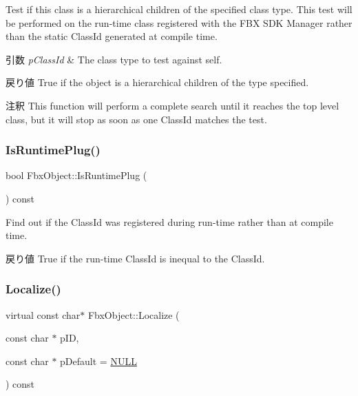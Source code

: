 Test if this class is a hierarchical children of the specified class type. This test will be performed on the run-\/time class registered with the F\+BX S\+DK Manager rather than the static Class\+Id generated at compile time. 
\begin{DoxyParams}{引数}
{\em p\+Class\+Id} & The class type to test against self. \\
\hline
\end{DoxyParams}
\begin{DoxyReturn}{戻り値}
True if the object is a hierarchical children of the type specified. 
\end{DoxyReturn}
\begin{DoxyRemark}{注釈}
This function will perform a complete search until it reaches the top level class, but it will stop as soon as one Class\+Id matches the test. 
\end{DoxyRemark}
\mbox{\label{class_fbx_object_a4c804ecb85faa0544d305d9f7e98d777}} 
\subsubsection{\texorpdfstring{Is\+Runtime\+Plug()}{IsRuntimePlug()}}
{\footnotesize\ttfamily bool Fbx\+Object\+::\+Is\+Runtime\+Plug (\begin{DoxyParamCaption}{ }\end{DoxyParamCaption}) const}

Find out if the Class\+Id was registered during run-\/time rather than at compile time. \begin{DoxyReturn}{戻り値}
True if the run-\/time Class\+Id is inequal to the Class\+Id. 
\end{DoxyReturn}
\mbox{\label{class_fbx_object_a9b8ae43ccdd09be07b450e0ed54788ab}} 
\subsubsection{\texorpdfstring{Localize()}{Localize()}}
{\footnotesize\ttfamily virtual const char$\ast$ Fbx\+Object\+::\+Localize (\begin{DoxyParamCaption}\item[{const char $\ast$}]{p\+ID,  }\item[{const char $\ast$}]{p\+Default = {\ttfamily \hyperlink{fbxarch_8h_a070d2ce7b6bb7e5c05602aa8c308d0c4}{N\+U\+LL}} }\end{DoxyParamCaption}) const\hspace{0.3cm}{\ttfamily [virtual]}}


